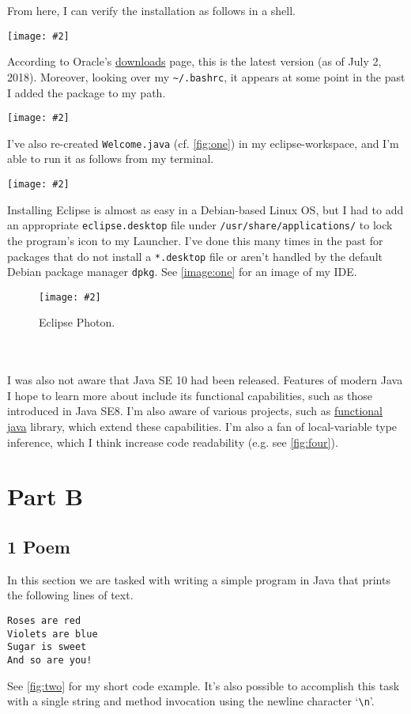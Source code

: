 \documentclass[leqno, 11pt]{article}
\newcommand{\centeredimage}[2]{%
  \begin{center}
    \texttt{[image: \#2]}
  \end{center}
}
\begin{document}
From here, I can verify the installation as follows in a shell.
\centeredimage{0.6}{photos/jdk.png}
According to Oracle's \href{http://www.oracle.com/technetwork/java/javase/downloads/index.html}{downloads} page, this is the latest version (as of July 2, 2018). Moreover, looking over my \texttt{\textasciitilde/.bashrc}, it appears at some point in the past I added the package to my path.
\centeredimage{0.6}{photos/path.png}
I've also re-created \texttt{Welcome.java} (cf. \autoref{fig:one}) in my eclipse-workspace, and I'm able to run it as follows from my terminal.
\centeredimage{0.6}{photos/first_program.png}
Installing Eclipse is almost as easy in a Debian-based Linux OS, but I had to add an appropriate \texttt{eclipse.desktop} file under \texttt{/usr/share/applications/} to lock the program's icon to my Launcher. I've done this many times in the past for packages that do not install a \texttt{*.desktop} file or aren't handled by the default Debian package manager \texttt{dpkg}. See \autoref{image:one} for an image of my IDE.
\begin{figure}[ht!]
  \centeredimage{0.34}{photos/ide.png}
  \caption{Eclipse Photon.}
  \label{image:one}
\end{figure}\\\\
I was also not aware that Java SE 10 had been released. Features of modern Java I hope to learn more about include its functional capabilities, such as those introduced in Java SE8. I'm also aware of various projects, such as \href{https://github.com/functionaljava/functionaljava}{functional java} library, which extend these capabilities. I'm also a fan of local-variable type inference, which I think increase code readability (e.g. see \autoref{fig:four}).
\section*{Part B}
\subsection*{1 Poem}
In this section we are tasked with writing a simple program in Java that prints the
following lines of text.
\begin{verbatim}
Roses are red
Violets are blue
Sugar is sweet
And so are you!
\end{verbatim}
See \autoref{fig:two} for my short code example. It's also possible to accomplish this task with a single string and method invocation using the newline character `\texttt{\textbackslash n}'.
\end{document}

